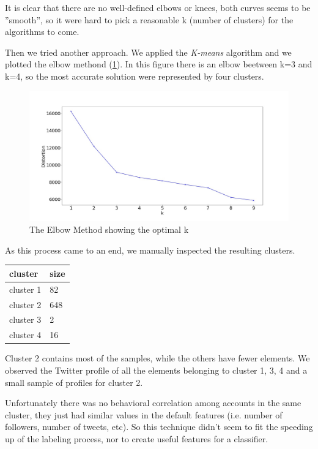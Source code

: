 \newpage
It is clear that there are no well-defined elbows or knees, both curves seems to be ''smooth'', so it were hard to pick a reasonable k (number of clusters) for the algorithms to come.

Then we tried another approach. We applied the \emph{K-means} algorithm and we plotted the elbow methond (\ref{fig:elbow}). In this figure there is an elbow beetween k=3 and k=4, so the most accurate solution were represented by four clusters.

\begin{figure}
	\includegraphics[width=\linewidth]{chapter3/figure/elbow.jpg}
	\caption{The Elbow Method showing the optimal k}
	\label{fig:elbow}
\end{figure}


As this process came to an end, we manually inspected the resulting clusters.

\begin{center}
	\begin{tabular}{ll}
	\\cluster&size\\
	\hline\hline
	cluster 1&82\\
	cluster 2&648\\
	cluster 3&2\\
	cluster 4&16\\\hline
	\end{tabular}
\end{center}

Cluster 2 contains most of the samples, while the others have fewer elements.
We observed the Twitter profile of all the elements belonging to cluster 1, 3, 4 and a small sample of profiles for cluster 2.

Unfortunately there was no behavioral correlation among accounts in the same cluster, they just had similar values in the default features (i.e. number of followers, number of tweets, etc). So this technique didn't seem to fit the speeding up of the labeling process, nor to create useful features for a classifier.

